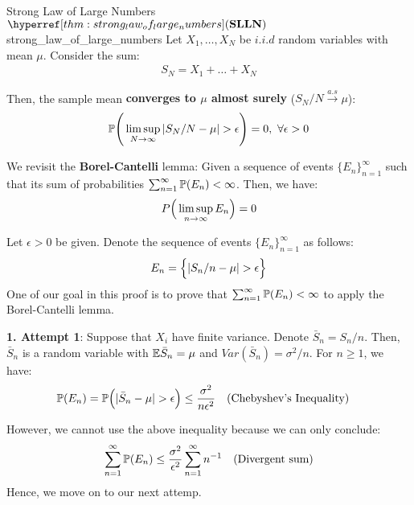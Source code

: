 \begin{theorem}{Strong Law of Large Numbers $\SLLN$}{strong_law_of_large_numbers}
    Let $X_1, \dots, X_N$ be $i.i.d$ random variables with mean $\mu$. Consider the sum:
    \begin{align*}
        S_N = X_1 + \dots + X_N
    \end{align*}

    \noindent Then, the sample mean \textbf{converges to $\mu$ almost surely} ($S_N/N\xrightarrow{a.s}\mu$):
    \begin{align}
        \mathbb{P}\Bigg( 
            \limsup_{N\to\infty}|S_N/N - \mu| > \epsilon
         \Bigg) = 0, \ \forall \epsilon > 0
    \end{align}
\end{theorem}

\begin{proof*}
    We revisit the \textbf{Borel-Cantelli} lemma: Given a sequence of events $\{E_n\}_{n=1}^\infty$ such that its sum of probabilities $\sum_{n=1}^\infty \mathbb{P}(E_n) < \infty$. Then, we have:
    \begin{align}
        P\Big( 
            \limsup_{n\to\infty} E_n 
         \Big) = 0
    \end{align}
    
    \noindent Let $\epsilon>0$ be given. Denote the sequence of events $\{E_n\}_{n=1}^\infty$ as follows:
    \begin{align*}
        E_n = \Big\{ 
            | S_n / n - \mu | > \epsilon
         \Big\}
    \end{align*} 
    \noindent One of our goal in this proof is to prove that $\sum_{n=1}^\infty \mathbb{P}(E_n)<\infty$ to apply the Borel-Cantelli lemma.

    \noindent\newline\textbf{1. Attempt 1}: Suppose that $X_i$ have finite variance. Denote $\bar S_n = S_n/n$. Then, $\bar S_n$ is a random variable with $\mathbb{E} \bar S_n=\mu$ and $Var(\bar S_n)=\sigma^2/n$. For $n\ge1$, we have:
    \begin{align*}
        \mathbb{P}(E_n) &= \mathbb{P}\Big( |\bar S_n - \mu| > \epsilon \Big) \le \frac{\sigma^2}{n\epsilon^2} \ \ \ (\text{Chebyshev's Inequality})
    \end{align*}

    \noindent However, we cannot use the above inequality because we can only conclude:
    \begin{align*}
        \sum_{n=1}^\infty \mathbb{P}(E_n) \le \frac{\sigma^2}{\epsilon^2} \sum_{n=1}^\infty n^{-1} \ \ \ (\text{Divergent sum})
    \end{align*}
    \noindent Hence, we move on to our next attemp.


\end{proof*}
